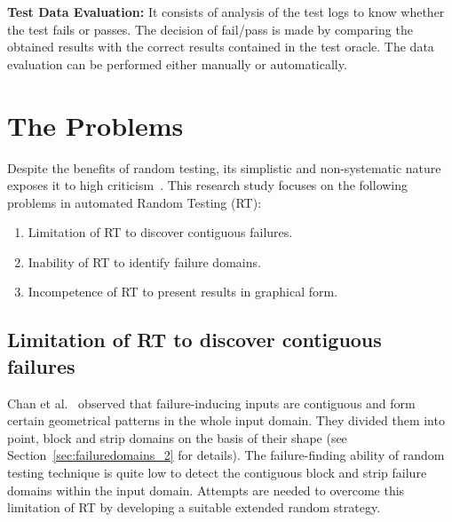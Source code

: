 \textbf{Test Data Evaluation:} It consists of analysis of the test logs to know whether the test fails or passes. The decision of fail/pass is made by comparing the obtained results with the correct results contained in the test oracle. The data evaluation can be performed either manually or automatically.

%

\section{The Problems}
Despite the benefits of random testing, its simplistic and non-systematic nature exposes it to high criticism~\cite{myers2011art, white1987software}. This research study focuses on the following problems in automated Random Testing (RT):


\begin{enumerate}
\item Limitation of RT to discover contiguous failures.
\item Inability of RT to identify failure domains.
\item Incompetence of RT to present results in graphical form. 
\end{enumerate}

\subsection{Limitation of RT to discover contiguous failures}
Chan et al.~\cite{chan1996proportional} observed that failure-inducing inputs are contiguous and form certain geometrical patterns in the whole input domain. They divided them into point, block and strip domains on the basis of their shape (see Section~\ref{sec:failuredomains_2} for details). %
The failure-finding ability of random testing technique is quite low to detect the contiguous block and strip failure domains within the input domain. Attempts are needed to overcome this limitation of RT by developing a suitable extended random strategy.

